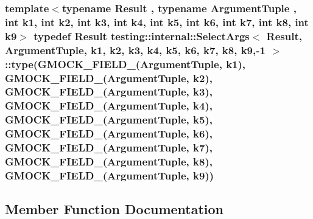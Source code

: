 \subsubsection[{\texorpdfstring{type}{type}}]{\setlength{\rightskip}{0pt plus 5cm}template$<$typename Result , typename Argument\+Tuple , int k1, int k2, int k3, int k4, int k5, int k6, int k7, int k8, int k9$>$ typedef Result {\bf testing\+::internal\+::\+Select\+Args}$<$ Result, Argument\+Tuple, k1, k2, k3, k4, k5, k6, k7, k8, k9,-\/1 $>$\+::type({\bf G\+M\+O\+C\+K\+\_\+\+F\+I\+E\+L\+D\+\_\+}(Argument\+Tuple, k1), {\bf G\+M\+O\+C\+K\+\_\+\+F\+I\+E\+L\+D\+\_\+}(Argument\+Tuple, k2), {\bf G\+M\+O\+C\+K\+\_\+\+F\+I\+E\+L\+D\+\_\+}(Argument\+Tuple, k3), {\bf G\+M\+O\+C\+K\+\_\+\+F\+I\+E\+L\+D\+\_\+}(Argument\+Tuple, k4), {\bf G\+M\+O\+C\+K\+\_\+\+F\+I\+E\+L\+D\+\_\+}(Argument\+Tuple, k5), {\bf G\+M\+O\+C\+K\+\_\+\+F\+I\+E\+L\+D\+\_\+}(Argument\+Tuple, k6), {\bf G\+M\+O\+C\+K\+\_\+\+F\+I\+E\+L\+D\+\_\+}(Argument\+Tuple, k7), {\bf G\+M\+O\+C\+K\+\_\+\+F\+I\+E\+L\+D\+\_\+}(Argument\+Tuple, k8), {\bf G\+M\+O\+C\+K\+\_\+\+F\+I\+E\+L\+D\+\_\+}(Argument\+Tuple, k9))}\hypertarget{classtesting_1_1internal_1_1SelectArgs_3_01Result_00_01ArgumentTuple_00_01k1_00_01k2_00_01k3_00_6cec9358efe806d84292a8e378f8b1d2_aa370f95245d998aea225e3f24f3b9208}{}\label{classtesting_1_1internal_1_1SelectArgs_3_01Result_00_01ArgumentTuple_00_01k1_00_01k2_00_01k3_00_6cec9358efe806d84292a8e378f8b1d2_aa370f95245d998aea225e3f24f3b9208}


\subsection{Member Function Documentation}
